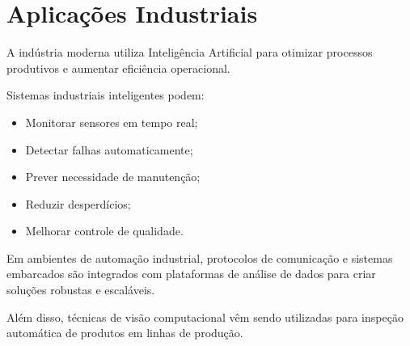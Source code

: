\section{Aplicações Industriais}

A indústria moderna utiliza Inteligência Artificial para otimizar processos produtivos e aumentar
eficiência operacional.

Sistemas industriais inteligentes podem:

\begin{itemize}
    \item Monitorar sensores em tempo real;
    \item Detectar falhas automaticamente;
    \item Prever necessidade de manutenção;
    \item Reduzir desperdícios;
    \item Melhorar controle de qualidade.
\end{itemize}

Em ambientes de automação industrial, protocolos de comunicação e sistemas embarcados são
integrados com plataformas de análise de dados para criar soluções robustas e escaláveis.
 
Além disso, técnicas de visão computacional vêm sendo utilizadas para inspeção automática de
produtos em linhas de produção.